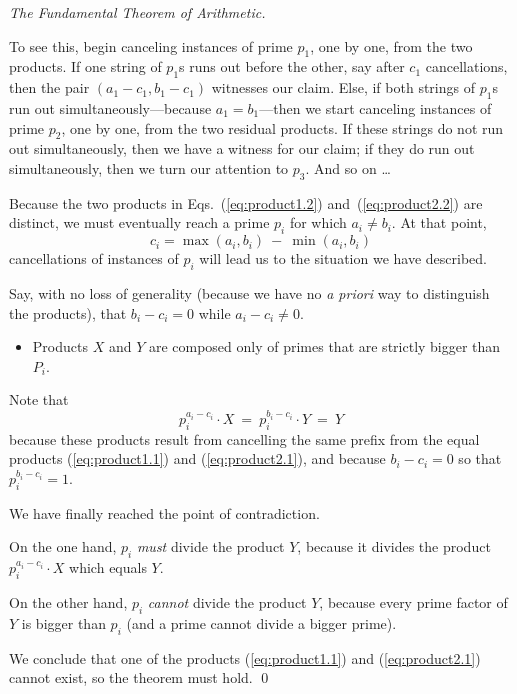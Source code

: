 \begin{proof}[The Fundamental Theorem of Arithmetic]
\begin{itemize}
To see this, begin canceling instances of prime $p_1$, one by one, from the two products.  If one string of $p_1$s runs out before the other, say after $c_1$ cancellations, then the pair $(a_1 -c_1, b_1 -c_1)$ witnesses our claim.  Else, if both strings of $p_1$s run out simultaneously---because $a_1 = b_1$---then we start canceling instances of prime $p_2$, one by one, from the two residual products.  If these strings do not run out simultaneously, then we have a witness for our claim; if they do run out simultaneously, then we turn our attention to $p_3$.  And so on \ldots

Because the two products in Eqs.~(\ref{eq:product1.2}) and~(\ref{eq:product2.2}) are distinct, we must eventually reach a prime $p_i$ for which $a_i \neq b_i$.  At that point,
\[ c_i = \max(a_i, b_i) \ - \  \min(a_i, b_i) \]
cancellations of instances of $p_i$ will lead us to the situation we have described. 
\end{itemize}

Say, with no loss of generality (because we have no {\it a priori} way to distinguish the products), that $b_i -c_i = 0$ while $a_i -c_i \neq 0$.

\begin{itemize}
\item
Products $X$ and $Y$ are composed only of primes that are strictly bigger than $P_i$.
\end{itemize}
Note that 
\[ p_i^{a_i - c_i} \cdot X \ = \ p_i^{b_i -c_i} \cdot Y \ = \ Y \]
because these products result from cancelling the same prefix from the equal products (\ref{eq:product1.1}) and (\ref{eq:product2.1}), and because $b_i -c_i =0$ so that $p_i^{b_i -c_i}  = 1$.

\medskip

\noindent
We have finally reached the point of contradiction.

\smallskip

On the one hand, $p_i$ {\em must} divide the product $Y$, because it divides the product $p_i^{a_i -c_i} \cdot X$ which equals $Y$.

On the other hand, $p_i$ {\em cannot} divide the product $Y$, because every prime factor of $Y$ is bigger than $p_i$ (and a prime cannot divide a bigger prime).

\smallskip

We conclude that one of the products (\ref{eq:product1.1}) and (\ref{eq:product2.1}) cannot exist, so the theorem must hold.  \qed
\end{proof}


